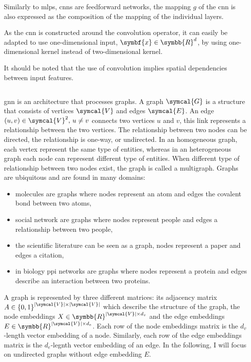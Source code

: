 \documentclass[../main.tex]{subfiles}
\begin{document}
	 Similarly to \glspl{mlp}, \glspl{cnn} are feedforward networks, the mapping \(g\) of the \gls{cnn} is also expressed as the composition of the mapping of the individual layers.

	 As the \gls{cnn} is constructed around the convolution operator, it can easily be adapted to use one-dimensional input, \(\symbf{x} \in \symbb{R}^d\), by using one-dimensional kernel instead of two-dimensional kernel.

	 It should be noted that the use of convolution implies spatial dependencies between input features.

 \subsection{}
	 \Gls{gnn} is an architecture that processes graphs.
	 A graph \(\symcal{G}\) is a structure that consists of vertices \(\symcal{V}\) and edges \(\symcal{E}\).
	 An edge \(\left(u,v\right) \in \symcal{V}^2,\, u\neq v\) connects two vertices \(u\) and \(v\), this link represents a relationship between the two vertices.
	 The relationship between two nodes can be directed, the relationship is one-way, or undirected.
	 In an homogeneous graph, each vertex represent the same type of entities, whereas in an heterogeneous graph each node can represent different type of entities.
	 When different type of relationship between two nodes exist, the graph is called a multigraph.
	 Graphs are ubiquitous and are found in many domains:
	 \begin{itemize}[nosep]
		 \item molecules are graphs where nodes represent an atom and edges the covalent bond between two atoms,
		 \item social network are graphs where nodes represent people and edges a relationship between two people,
		 \item the scientific literature can be seen as a graph, nodes represent a paper and edges a citation,
		 \item in biology \gls{ppi} networks are graphs where nodes represent a protein and edges describe an interaction between two proteins.
	 \end{itemize}

	 A graph is represented by three different matrices: its adjacency matrix \(A \in {\left\{0,1\right\}}^{\left|\symcal{V}\right| \times \left|\symcal{V}\right|}\) which describe the structure of the graph, the node embeddings \(X \in \symbb{R}^{\left|\symcal{V}\right| \times d_v}\) and the edge embeddings \(E \in \symbb{R}^{\left|\symcal{V}\right| \times d_e}\).
	 Each row of the node embeddings matrix is the \(d_v\)-length vector embedding of a node.
	 Similarly, each row of the edge embeddings matrix is  the \(d_e\)-legnth vector embedding of an edge.
	 In the following, I will focus on undirected graphs without edge embedding \(E\).
\end{document}
